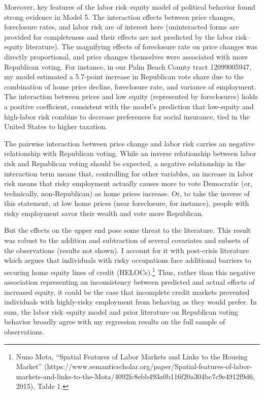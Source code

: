 \documentclass[12pt,oneside]{psthesis}
\begin{document}
Moreover, key features of the labor risk--equity model of political behavior found strong evidence in Model 5.
The interaction effects between price changes, foreclosure rates, and labor risk are of interest here (uninteracted forms are provided for completeness and their effects are not predicted by the labor risk--equity literature).
The magnifying effects of foreclosure rate on price changes was directly proportional, and price changes themselves were associated with more Republican voting.
For instance, in our Palm Beach County tract 12099005947, my model estimated a 5.7-point increase in Republican vote share due to the combination of home price decline, foreclosure rate, and variance of employment.
The interaction between prices and low equity (represented by foreclosures) holds a positive coefficient, consistent with the model's prediction that low-equity and high-labor risk combine to decrease preferences for social insurance, tied in the United States to higher taxation.

The pairwise interaction between price change and labor risk carries an negative relationship with Republican voting.
While an inverse relationship between labor risk and Republican voting should be expected, a negative relationship in the interaction term means that, controlling for other variables, an increase in labor risk means that risky employment actually causes more to vote Democratic (or, technically, non-Republican) as home prices increase.
Or, to take the inverse of this statement, at low home prices (near foreclosure, for instance), people with risky employment savor their wealth and vote more Republican.

But the effects on the upper end pose some threat to the literature.
This result was robust to the addition and subtraction of several covariates and subsets of the observations (results not shown).
I account for it with post-crisis literature which argues that individuals with risky occupations face additional barriers to securing home equity lines of credit (HELOCs).\footnote{Nuno Mota, ``Spatial Features of Labor Markets and Links to the Housing Market'' (https://www.semanticscholar.org/paper/Spatial-features-of-labor-markets-and-links-to-the-Mota/4092fc8ebb493a0b116f20a304bc7c9e4912f9d6, 2015), Table 1.}
Thus, rather than this negative association representing an inconsistency between predicted and actual effects of increased equity, it could be the case that incomplete credit markets prevented individuals with highly-risky employment from behaving as they would prefer.
In sum, the labor risk--equity model and prior literature on Republican voting behavior broadly agree with my regression results on the full sample of observations.
\end{document}
